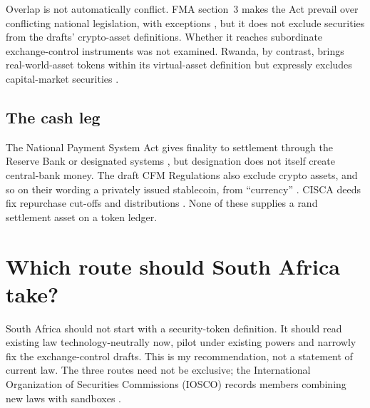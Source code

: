 \documentclass[12pt,a4paper]{article}
\begin{document}
Overlap is not automatically conflict. FMA section~3 makes the Act prevail over conflicting national legislation, with exceptions \citep[ss~3(3)--(5), p.~15]{FMA2012}, but it does not exclude securities from the drafts' crypto-asset definitions. Whether it reaches subordinate exchange-control instruments was not examined. Rwanda, by contrast, brings real-world-asset tokens within its virtual-asset definition but expressly excludes capital-market securities \citep[arts~4(2)(a), 4(3)(c), pp.~20--21]{Rwanda2026VirtualAssets}.

\subsection{The cash leg}\label{sec:sa_cash}
The National Payment System Act gives finality to settlement through the Reserve Bank or designated systems \citep[ss~1, 4A(1), 5, pp.~3, 6, 8]{NPSAct1998}, but designation does not itself create central-bank money. The draft CFM Regulations also exclude crypto assets, and so on their wording a privately issued stablecoin, from ``currency'' \citep[reg~1(1), p.~2]{NT2026CFMDraft}. CISCA deeds fix repurchase cut-offs and distributions \citep[Sched.~1 items~1(f), 2(b)--(c), p.~45]{CISCA2002}. None of these supplies a rand settlement asset on a token ledger.


\section{Which route should South Africa take?}\label{sec:policy}
South Africa should not start with a security-token definition. It should read existing law technology-neutrally now, pilot under existing powers and narrowly fix the exchange-control drafts. This is my recommendation, not a statement of current law. The three routes need not be exclusive; the International Organization of Securities Commissions (IOSCO) records members combining new laws with sandboxes \citep[p.~63]{IOSCO2025}.
\end{document}

